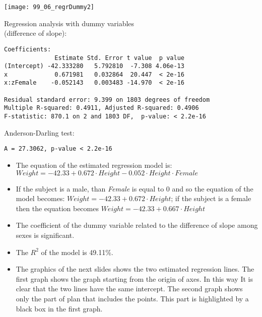 \begin{frame}
  \vspace{-0.3cm}
  \begin{center}
    \texttt{[image: 99\_06\_regrDummy2]}
  \end{center}
\end{frame}

\begin{frame}[fragile]
  Regression analysis with dummy variables\\ (difference of slope):\\
  \begin{small}
    \begin{verbatim}
Coefficients:
              Estimate Std. Error t value  p value   
(Intercept) -42.333280   5.792810  -7.308 4.06e-13
x             0.671981   0.032864  20.447  < 2e-16
x:zFemale    -0.052143   0.003483 -14.970  < 2e-16

Residual standard error: 9.399 on 1803 degrees of freedom
Multiple R-squared: 0.4911,	Adjusted R-squared: 0.4906 
F-statistic: 870.1 on 2 and 1803 DF,  p-value: < 2.2e-16 
    \end{verbatim}
  \end{small}
  Anderson-Darling test:\\
  \begin{small}
    \begin{verbatim}
A = 27.3062, p-value < 2.2e-16
    \end{verbatim}
  \end{small}
\end{frame}

\begin{frame}
  \begin{small}
    \begin{itemize}
      \item The equation of the estimated regression model is: $ Weight = -42.33 + 0.672 \cdot Height - 0.052 \cdot Height \cdot Female $
      \item If the subject is a male, than \textit{Female} is equal to 0 and so the equation of the model becomes: $ Weight = -42.33 + 0.672 \cdot Height $; if the subject is a female then the equation becomes $ Weight = -42.33 + 0.667 \cdot Height $
      \item The coefficient of the dummy variable related to the difference of slope among sexes is significant.
      \item The $R^2$ of the model is 49.11\%.
      \item The graphics of the next slides shows the two estimated regression lines. The first graph shows the graph starting from the origin of axes. In this way It is clear that the two lines have the same intercept. The second graph shows only the part of plan that includes the points. This part is highlighted by a black box in the first graph.  
    \end{itemize}
  \end{small}
\end{frame}

